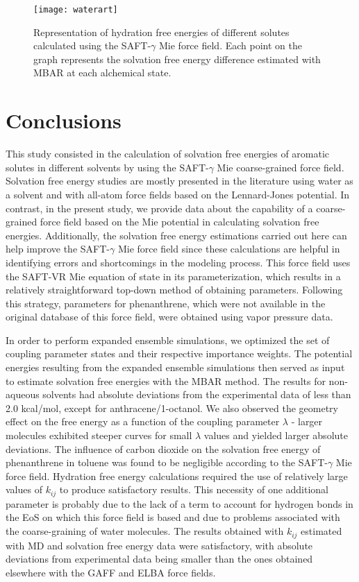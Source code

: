 \documentclass[preprint]{elsarticle}
\begin{document}
	\begin{figure}
		\centering
		\texttt{[image: waterart]}
		\caption{Representation of hydration free energies of different solutes calculated using the SAFT-$\gamma$ Mie force field. Each point on the graph represents the solvation free energy difference estimated with MBAR at each alchemical state.}
		\label{fig:water}
	\end{figure}
	
	\section{Conclusions}

	This study consisted in the calculation of solvation free energies of aromatic solutes in different solvents by using the SAFT-$\gamma$ Mie coarse-grained force field. Solvation free energy studies are mostly presented in the literature using water as a solvent and with all-atom force fields based on the Lennard-Jones potential. In contrast, in the present study, we provide data about the capability of a coarse-grained force field based on the Mie potential in calculating solvation free energies. Additionally, the solvation free energy estimations carried out here can help improve the SAFT-$\gamma$ Mie force field since these calculations are helpful in identifying errors and shortcomings in the modeling process. This force field uses the SAFT-VR Mie equation of state in its parameterization, which results in a relatively straightforward top-down method of obtaining parameters. Following this strategy, parameters for phenanthrene, which were not available in the original database of this force field, were obtained using vapor pressure data.

	In order to perform expanded ensemble simulations, we optimized the set of coupling parameter states and their respective importance weights. The potential energies resulting from the expanded ensemble simulations then served as input to estimate solvation free energies with the MBAR method. The results for non-aqueous solvents had absolute deviations from the experimental data of less than 2.0 kcal/mol, except for anthracene/1-octanol. We also observed the geometry effect on the free energy as a function of the coupling parameter $\lambda$ - larger molecules exhibited steeper curves for small $\lambda$ values and yielded larger absolute deviations. The influence of carbon dioxide on the solvation free energy of phenanthrene in toluene was found to be negligible according to the SAFT-$\gamma$ Mie force field. Hydration free energy calculations required the use of relatively large values of $k_{ij}$ to produce satisfactory results.
	This necessity of one additional parameter is probably due to the lack of a term to account for hydrogen bonds in the EoS on which this force field is based and due to problems associated with the coarse-graining of water molecules. The results obtained with $k_{ij}$ estimated with MD and solvation free energy data were satisfactory, with absolute deviations from experimental data being smaller than the ones obtained elsewhere with the GAFF and ELBA force fields.
\end{document}
